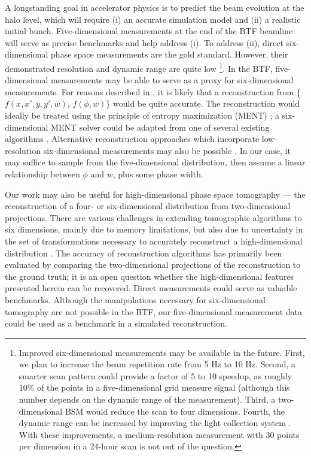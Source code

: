 \documentclass[%
 reprint,
 amsmath,amssymb,
 aps,
prstab,
]{revtex4-2}
\begin{document}
A longstanding goal in accelerator physics is to predict the beam evolution at the halo level, which will require (i) an accurate simulation model and (ii) a realistic initial bunch. Five-dimensional measurements at the end of the BTF beamline will serve as precise benchmarks and help address (i). To address (ii), direct six-dimensional phase space measurements are the gold standard. However, their demonstrated resolution and dynamic range are quite low %
\footnote{Improved six-dimensional measurements may be available in the future. First, we plan to increase the beam repetition rate from 5 Hz to 10 Hz. Second, a smarter scan pattern could provide a factor of 5 to 10 speedup, as roughly 10\% of the points in a five-dimensional grid measure signal (although this number depends on the dynamic range of the measurement). Third, a two-dimensional BSM would reduce the scan to four dimensions. Fourth, the dynamic range can be increased by improving the light collection system \cite{Aleksandrov2021}. With these improvements, a medium-resolution measurement with 30 points per dimension in a 24-hour scan is not out of the question.%
}. %
In the BTF, five-dimensional measurements may be able to serve as a proxy for six-dimensional measurements. For reasons described in \cite{Note1}, it is likely that a  reconstruction from \{$f(x, x', y, y', w)$, $f(\phi, w)$\} would be quite accurate. The reconstruction would ideally be treated using the principle of entropy maximization (MENT) \cite{Skilling1991}; a six-dimensional MENT solver could be adapted from one of several existing algorithms \cite{Skilling1984, Wong2022-tomography}. Alternative reconstruction approaches which incorporate low-resolution six-dimensional measurements may also be possible \cite{Dropulic2021}. In our case, it may suffice to sample from the five-dimensional distribution, then assume a linear relationship between $\phi$ and $w$, plus some phase width.

Our work may also be useful for high-dimensional phase space tomography --- the reconstruction of a four- or six-dimensional distribution from two-dimensional projections. There are various challenges in extending tomographic algorithms to six dimensions, mainly due to memory limitations, but also due to uncertainty in the set of transformations necessary to accurately reconstruct a high-dimensional distribution \cite{Hock2013, Wang2019, Wolski2020, Marchetti2021, Jaster-Merz2022, Wong2022-tomography, Wolski2022}. The accuracy of reconstruction algorithms has primarily been evaluated by comparing the two-dimensional projections of the reconstruction to the ground truth; it is an open question whether the high-dimensional features presented herein can be recovered. Direct measurements could serve as valuable benchmarks. Although the manipulations necessary for six-dimensional tomography are not possible in the BTF, our five-dimensional measurement data \cite{Hoover2023_Zenodo} could be used as a benchmark in a simulated reconstruction.
\end{document}
